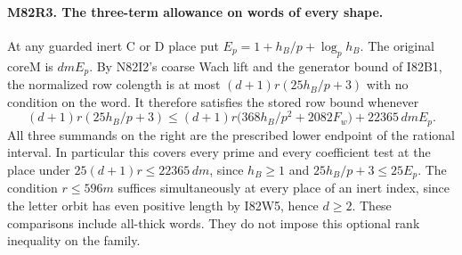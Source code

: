 \paragraph{M82R3. The three-term allowance on words of every shape.}
At any guarded inert C or D place put
$E_p=1+h_B/p+\log_p h_B$. The original $\mathrm{coreM}$
is $dm E_p$. By N82I2's coarse Wach lift and the generator
bound of I82B1, the normalized row colength is at most
$(d+1)r(25h_B/p+3)$ with no condition on the word. It therefore
satisfies the stored row bound whenever
\[
  (d+1)r(25h_B/p+3)
  \le (d+1)r\bigl(368h_B/p^2+2082F_w\bigr)
                            +22365\,dm E_p.
\]
All three summands on the right are the prescribed lower
endpoint of the rational interval. In particular this covers
every prime and every coefficient test at the place under
$25(d+1)r\le22365\,dm$, since $h_B\ge1$ and
$25h_B/p+3\le25E_p$. The condition $r\le596m$ suffices
simultaneously at every place of an inert index, since the
letter orbit has even positive length by I82W5, hence $d\ge2$.
These comparisons include all-thick words. They do not impose
this optional rank inequality on the family.
